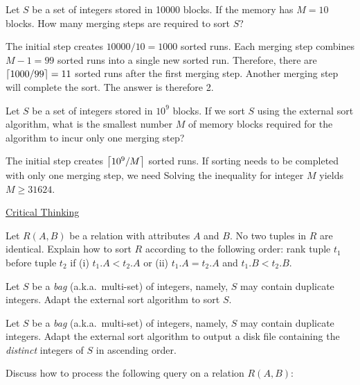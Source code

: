 Let $S$ be a set of integers stored in 10000 blocks. If the memory has $M = 10$ blocks. How many merging steps are required to sort $S$?

\begin{sol}
 The initial step creates $10000/10 = 1000$ sorted runs. Each merging step combines $M - 1 = 99$ sorted runs into a single new sorted run. Therefore, there are $\left \lceil 1000/99 \right \rceil = 11$ sorted runs after the first merging step. Another merging step will complete the sort. The answer is therefore 2.
\end{sol}

 Let $S$ be a set of integers stored in $10^9$ blocks. If we sort $S$ using the external sort algorithm, what is the smallest number $M$ of memory blocks required for the algorithm to incur only one merging step?

\begin{sol}
 The initial step creates $\left \lceil 10^9 / M \right \rceil$ sorted runs. If sorting needs to be completed with only one merging step, we need
Solving the inequality for integer $M$ yields $M \ge 31624$.

\end{sol}

\begin{center}
    \uline{Critical Thinking}
\end{center}

 Let $R(A, B)$ be a relation with attributes $A$ and $B$. No two tuples in $R$ are identical. Explain how to sort $R$ according to the following order: rank tuple $t_1$ before tuple $t_2$ if (i) $t_1.A < t_2.A$ or (ii) $t_1.A = t_2.A$ and $t_1.B < t_2.B$.

 Let $S$ be a {\em bag} (a.k.a.\ multi-set) of integers, namely, $S$ may contain duplicate integers. Adapt the external sort algorithm to sort $S$.

 Let $S$ be a {\em bag} (a.k.a.\ multi-set) of integers, namely, $S$ may contain duplicate integers. Adapt the external sort algorithm to output a disk file containing the {\em distinct} integers of $S$ in ascending order.

 Discuss how to process the following query on a relation $R(A, B)$:



